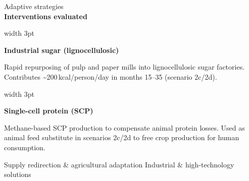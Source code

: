 \documentclass[final]{beamer}
\newlength{\sepwidth}
\newlength{\fullwidth}           %
\newenvironment{labelblock}[2]{%
  \begin{block}{%
      {\small\color{structure.fg!70!bg}#1}%
      \\[2pt]                                  %
      {\large\bfseries#2}%
      }%
      }{%
  \end{block}%
  }
\newcommand{\separatorcolumn}{\begin{column}{\sepwidth}\end{column}}
\begin{document}
\begin{frame}[t]
\begin{columns}[t]
\begin{column}{\fullwidth}
\begin{labelblock}{Adaptive strategies}{Interventions evaluated}
\begin{minipage}[t]{0.22\linewidth}
          \raggedright
          \textcolor{ambermid}{\vrule width 3pt}\hspace{3pt}%
          \begin{minipage}[t]{\dimexpr\linewidth-6pt\relax}
            {\bfseries\small Industrial sugar (lignocellulosic)}\par\vspace{2pt}
            {\footnotesize Rapid repurposing of pulp and paper mills into
            lignocellulosic sugar factories. Contributes
            {\textasciitilde}200\,kcal/person/day in months 15--35
            (scenario 2c/2d).}
          \end{minipage}
        \end{minipage}\hfill
        \begin{minipage}[t]{0.22\linewidth}
          \raggedright
          \textcolor{ambermid}{\vrule width 3pt}\hspace{3pt}%
          \begin{minipage}[t]{\dimexpr\linewidth-6pt\relax}
            {\bfseries\small Single-cell protein (SCP)}\par\vspace{2pt}
            {\footnotesize Methane-based SCP production to compensate animal protein
            losses. Used as animal feed substitute in scenarios 2c/2d to free crop
            production for human consumption.}
          \end{minipage}
        \end{minipage}

        \vspace{8pt}

        \begin{minipage}{\linewidth}
          \footnotesize
          \raisebox{1pt}{\textcolor{tealmid}{\rule{10pt}{10pt}}}
          \hspace{3pt} Supply redirection \& agricultural adaptation
          \hspace{24pt}
          \raisebox{1pt}{\textcolor{ambermid}{\rule{10pt}{10pt}}}
          \hspace{3pt} Industrial \& high-technology solutions
        \end{minipage}
      \end{labelblock}
    \end{column}
    \separatorcolumn
  \end{columns}

  \vspace{0.5cm}


\end{frame}
\end{document}
